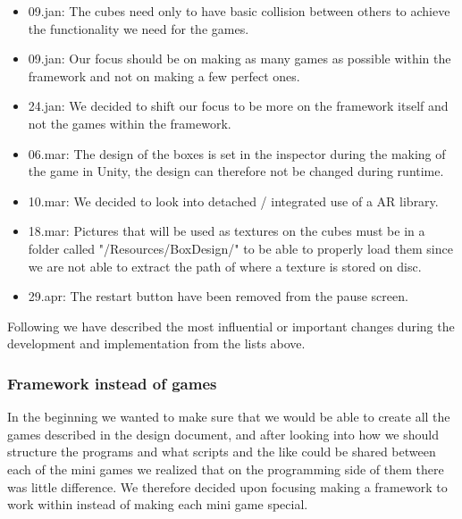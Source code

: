 \begin{itemize}
	
	\item 09.jan: The cubes need only to have basic collision between others to achieve the functionality we need for the games.
	\item 09.jan: Our focus should be on making as many games as possible within the framework and not on making  a few perfect ones.
	\item 24.jan: We decided to shift our focus to be more on the framework itself and not the games within the framework.
	\item 06.mar: The design of the boxes is set in the inspector during the making of the game in Unity, the design can therefore not be changed during runtime.
	\item 10.mar: We decided to look into detached / integrated use of a AR library.
	\item 18.mar: Pictures that will be used as textures on the cubes must be in a folder called "/Resources/BoxDesign/" to be able to properly load them since we are not able to extract the path of where a texture is stored on disc.
	\item 29.apr: The restart button have been removed from the pause screen.
\end{itemize}
	
Following we have described the most influential or important changes during the development and implementation from the lists above.

\subsubsection{Framework instead of games}
In the beginning we wanted to make sure that we would be able to create all the games described in the design document, and after looking into how we should structure the programs and what scripts and the like could be shared between each of the mini games we realized that on the programming side of them there was little difference. We therefore decided upon focusing making a framework to work within instead of making each mini game special.

